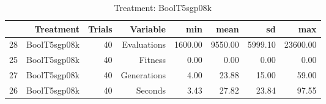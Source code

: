 \begin{table}[ht]
\centering
\begin{tabular}{rrrrrrrr}
  \hline
 & Treatment & Trials & Variable & min & mean & sd & max \\ 
  \hline
28 & BoolT5sgp08k &  40 & Evaluations & 1600.00 & 9550.00 & 5999.10 & 23600.00 \\ 
  25 & BoolT5sgp08k &  40 & Fitness & 0.00 & 0.00 & 0.00 & 0.00 \\ 
  27 & BoolT5sgp08k &  40 & Generations & 4.00 & 23.88 & 15.00 & 59.00 \\ 
  26 & BoolT5sgp08k &  40 & Seconds & 3.43 & 27.82 & 23.84 & 97.55 \\ 
   \hline
\end{tabular}
\caption{Treatment: BoolT5sgp08k} 
\end{table}
